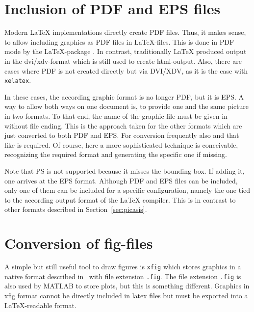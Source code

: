\section{Inclusion of PDF and EPS files}\label{sec:figpdf}

Modern \LaTeX{} implementations directly create PDF files. 
Thus, it makes sense, 
to allow including graphics as PDF files in \LaTeX-files. 
This is done in PDF mode 
by the \LaTeX-package . 
In contrast, traditionally \LaTeX{} produced output in the \gls{dvi}/\gls{xdv}-format 
which is still used to create \gls{html}-output. 
Also, there are cases where PDF is not created directly but via DVI/XDV, 
as it is the case with \texttt{xelatex}. 

In these cases, the according graphic format is no longer PDF, but it is EPS\@. 
A way to allow both ways on one document is, 
to provide one and the same picture in two formats. 
To that end, the name of the graphic file must be given in  
without file ending. 
This is the approach taken for the other formats 
which are just converted to both PDF and EPS\@. 
For conversion frequently also  and that like is required.
Of course, here a more sophisticated technique is conceivable, 
recognizing the required format and generating the specific one if missing. 

Note that PS is not supported because it misses the bounding box. 
If adding it, one arrives at the EPS format. 
Although PDF and EPS files can be included, 
only one of them can be included for a specific configuration, 
namely the one tied to the according output format of the \LaTeX{} compiler. 
This is in contrast to other formats described in Section~\ref{sec:picasis}. 



\section{Conversion of fig-files}\label{sec:fig2dev}



A simple but still useful tool to draw figures is \texttt{xfig} 
which stores graphics in a native format 
described in~\cite{XFigF} with file extension \texttt{.fig}. 
The file extension \texttt{.fig} is also used by MATLAB to store plots, 
but this is something different. 
Graphics in xfig format cannot be directly included in latex files 
but must be exported into a \LaTeX-readable format. 

